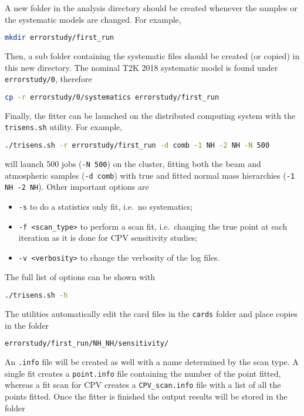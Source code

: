 \documentclass[a4paper, 11pt]{article}
\begin{document}
A new folder in the analysis directory should be created whenever the samples or the systematic models are changed.
For example,
\begin{lstlisting}[language=bash]
	mkdir errorstudy/first_run
\end{lstlisting}
Then, a sub folder containing the systematic files should be created (or copied) in this new directory.
The nominal T2K 2018 systematic model is found under \texttt{errorstudy/0}, therefore
\begin{lstlisting}[language=bash]
	cp -r errorstudy/0/systematics errorstudy/first_run
\end{lstlisting}

Finally, the fitter can be launched on the distributed computing system with %
the \texttt{trisens.sh} utility.
For example,
\begin{lstlisting}[language=bash]
	./trisens.sh -r errorstudy/first_run -d comb -1 NH -2 NH -N 500
\end{lstlisting}
will launch 500 jobs (\texttt{-N 500}) on the cluster, fitting both the beam and atmospheric samples %
(\texttt{-d comb}) with true and fitted normal mass hierarchies (\texttt{-1 NH -2 NH}).
Other important options are 
\begin{itemize}
		\small
	\item \texttt{-s} to do a statistics only fit, i.e.\ no systematics;
	\item \texttt{-f <scan\_type>} to perform a scan fit, i.e.\ changing the true point at each iteration %
		as it is done for CPV sensitivity studies;
	\item \texttt{-v <verbosity>} to change the verbosity of the log files.
\end{itemize}
The full list of options can be shown with
\begin{lstlisting}[language=bash]
	./trisens.sh -h
\end{lstlisting}
The utilities automatically edit the card files in the \texttt{cards} folder and place copies %
in the folder
\begin{lstlisting}[language=bash]
	errorstudy/first_run/NH_NH/sensitivity/
\end{lstlisting}
An \texttt{.info} file will be created as well with a name determined by the scan type.
A single fit creates a \texttt{point.info} file containing the number of the point fitted, %
whereas a fit scan for CPV creates a \texttt{CPV\_scan.info} file with a list of all the %
points fitted.
Once the fitter is finished the output results will be stored in the folder %
\end{document}

